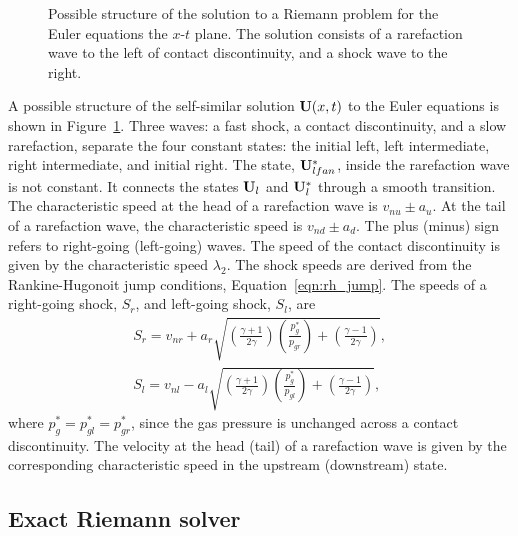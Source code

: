 \begin{figure}[htbp]
\begin{center}

\end{center}
\caption{Possible structure of the solution to a Riemann problem for the Euler equations the $x$-$t$ plane.  The solution consists of a rarefaction wave to the left of contact discontinuity, and a shock wave to the right.}
\label{fig:euler_rstates}
\end{figure}

A possible structure of the self-similar solution $\mathbf{U}(x,t)$ to the Euler equations is shown in Figure~\ref{fig:euler_rstates}.  Three waves: a fast shock, a contact discontinuity, and a slow rarefaction, separate the four constant states: the initial left, left intermediate, right intermediate, and initial right.  The state, $\mathbf{U}^*_{lfan}$, inside the rarefaction wave is not constant.  It connects the states $\mathbf{U}_l$ and $\mathbf{U}^*_l$ through a smooth transition.  The characteristic speed at the head of a rarefaction wave is $v_{nu} \pm a_u$.  At the tail of a rarefaction wave, the characteristic speed is $v_{nd} \pm a_d$.  The plus (minus) sign refers to right-going (left-going) waves.  The speed of the contact discontinuity is given by the characteristic speed $\lambda_2$.  The shock speeds are derived from the Rankine-Hugonoit jump conditions, Equation~\ref{eqn:rh_jump}.  The speeds of a right-going shock, $S_r$, and left-going shock, $S_l$, are
\begin{gather*}
S_r = v_{nr} + a_r \sqrt{\left(\frac{\gamma + 1}{2\gamma}\right) \left(\frac{p_g^*}{p_{gr}}\right) + \left(\frac{\gamma - 1}{2\gamma}\right)}, \\
S_{l} = v_{nl} - a_l \sqrt{\left(\frac{\gamma + 1}{2\gamma}\right) \left(\frac{p_g^*}{p_{gl}}\right) + \left(\frac{\gamma - 1}{2\gamma}\right)},
\end{gather*}
where $p^*_{g} = p^*_{gl} = p^*_{gr}$, since the gas pressure is unchanged across a contact discontinuity.  The velocity at the head (tail) of a rarefaction wave is given by the corresponding characteristic speed in the upstream (downstream) state.  

\subsection[Exact Riemann solvers]{Exact Riemann solver}
\label{sec:hydro_exact_rsolvers}


